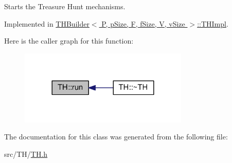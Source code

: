 Starts the Treasure Hunt mechanisms. 



Implemented in \hyperlink{classTHBuilder_1_1THImpl_a943301db5154fd7b672119b5c9917303}{T\+H\+Builder$<$ P, p\+Size, F, f\+Size, V, v\+Size $>$\+::\+T\+H\+Impl}.



Here is the caller graph for this function\+:\nopagebreak
\begin{figure}[H]
\begin{center}
\leavevmode
\includegraphics[width=228pt]{classTH_aa7b9b5ac83b57193d581f1bf1dfc7265_icgraph}
\end{center}
\end{figure}




The documentation for this class was generated from the following file\+:\begin{DoxyCompactItemize}
\item 
src/\+T\+H/\hyperlink{TH_8h}{T\+H.\+h}\end{DoxyCompactItemize}
